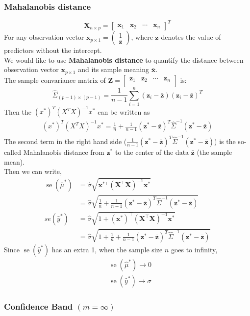 \documentclass[11pt,a4paper]{article}
\begin{document}
\subsubsection{Mahalanobis distance}
$$\mathbf{X}_{n\times p}=\begin{bmatrix}
    \mathbf{x}_1&\mathbf{x}_2&\cdots&\mathbf{x}_n
\end{bmatrix}^T$$
For any observation vector $\mathbf{x}_{p\times 1}=\begin{pmatrix}
    1\\
    \mathbf{z}
\end{pmatrix}$, where $\mathbf{z}$ denotes the value of predictors without the intercept.\\
We would like to use \textbf{Mahalanobis distance} to quantify the distance between observation vector $\mathbf{x}_{p\times 1}$ and its sample meaning $\bar{\mathbf{x}}$.\\
The sample convariance matrix of $\mathbf{Z}=\begin{bmatrix}
    \mathbf{z}_1&\mathbf{z}_2&\cdots&\mathbf{z}_n\\
\end{bmatrix}$ is:
$$\hat{\Sigma}_{(p-1)\times(p-1)}=\frac{1}{n-1}\sum_{i=1}^n(\mathbf{z}_i-\bar{\mathbf{z}})(\mathbf{z}_i-\bar{\mathbf{z}})^T$$
Then the $(x^*)^T(X^TX)^{-1}x^*$ can be written as
\begin{equation}
    \begin{aligned}
        (x^*)^T(X^TX)^{-1}x^*=\frac{1}{n}+\underline{\frac{1}{n-1}(\mathbf{z}^*-\bar{\mathbf{z}})^T\hat{\Sigma}^{-1}(\mathbf{z}^*-\bar{\mathbf{z}})}
    \end{aligned}
    \nonumber
\end{equation}
The second term in the right hand side ($\frac{1}{n-1}(\mathbf{z}^*-\bar{\mathbf{z}})^T\hat{\Sigma}^{-1}(\mathbf{z}^*-\bar{\mathbf{z}})$) is the so-called Mahalanobis distance from $\mathbf{z}^*$ to the center of the data $\bar{\mathbf{z}}$ (the sample mean).\\
Then we can write,
$$
\begin{aligned}
\operatorname{se}\left(\hat{\mu}^{*}\right) &=\hat{\sigma} \sqrt{\mathbf{x}^{* \top}\left(\mathbf{X}^{\top} \mathbf{X}\right)^{-1} \mathbf{x}^{*}} \\
&=\hat{\sigma} \sqrt{\frac{1}{n}+\frac{1}{n-1}\left(\mathbf{z}^{*}-\overline{\mathbf{z}}\right)^{T} \hat{\Sigma}^{-1}\left(\mathbf{z}^{*}-\overline{\mathbf{z}}\right)} \\
se\left(\hat{y}^{*}\right) &=\hat{\sigma} \sqrt{1+\left(\mathbf{x}^{*}\right)^{\top}\left(\mathbf{X}^{\top} \mathbf{X}\right)^{-1} \mathbf{x}^{*}} \\
&=\hat{\sigma} \sqrt{1+\frac{1}{n}+\frac{1}{n-1}\left(\mathbf{z}^{*}-\overline{\mathbf{z}}\right)^{T} \hat{\Sigma}^{-1}\left(\mathbf{z}^{*}-\overline{\mathbf{z}}\right)}
\end{aligned}
$$
Since $\operatorname{se}\left(\hat{y}^{*}\right)$ has an extra 1, when the sample size $n$ goes to infinity,
$$
\begin{aligned}
&\operatorname{se}\left(\hat{\mu}^{*}\right) \rightarrow 0 \\
&\operatorname{se}\left(\hat{y}^{*}\right) \rightarrow \sigma
\end{aligned}
$$

\subsubsection{Conﬁdence Band $(m=\infty)$}
\end{document}
